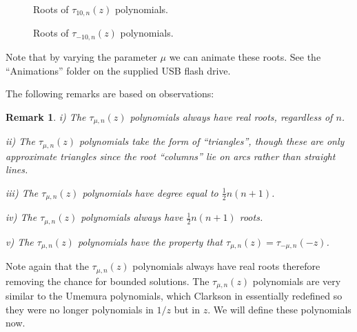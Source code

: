 \documentclass[12pt]{article}
\newtheorem{mydef3}{Remark}[section]
\numberwithin{figure}{section}
\numberwithin{equation}{section}
\numberwithin{table}{section}
\begin{document}
\begin{figure}[H]
\centering
{}
\caption{Roots of $\tau_{10,n}(z)$ polynomials.}
\end{figure}

\begin{figure}[H]
\centering
{}
\caption{Roots of $\tau_{-10,n}(z)$ polynomials.}
\end{figure}
Note that by varying the parameter $\mu$ we can animate these roots. See the ``Animations'' folder on the supplied USB flash drive.

The following remarks are based on observations:
\begin{mydef3}
\item[i)]
The $\tau_{\mu,n}(z)$ polynomials always have real roots, regardless of $n$.
\item[ii)]
The $\tau_{\mu,n}(z)$ polynomials take the form of ``triangles'', though these are only approximate triangles since the root ``columns'' lie on arcs rather than straight lines.
\item[iii)]
The $\tau_{\mu,n}(z)$ polynomials have degree equal to $\tfrac{1}{2}n(n+1)$.
\item[iv)]
The $\tau_{\mu,n}(z)$ polynomials always have $\tfrac{1}{2}n(n+1)$ roots.
\item[v)]
The $\tau_{\mu,n}(z)$ polynomials have the property that $\tau_{\mu,n}(z)=\tau_{-\mu,n}(-z)$.
\end{mydef3}
Note again that the $\tau_{\mu,n}(z)$ polynomials always have real roots therefore removing the chance for bounded solutions.
The $\tau_{\mu,n}(z)$ polynomials are very similar to the Umemura polynomials, which Clarkson in \cite{P:36:9532} essentially redefined so they were no longer polynomials in $1/z$ but in $z$. We will define these polynomials now.
\end{document}
